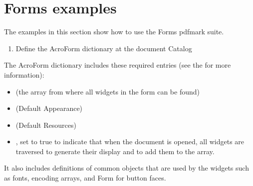 \documentclass[letterpaper,12pt,english,openany,oneside]{sphinxmanual}
\begin{document}
\section{Forms examples}
\label{\detokenize{pdfmark_Examples:forms-examples}}
The examples in this section show how to use the Forms pdfmark suite.
\begin{enumerate}
%
\item {} 
Define the AcroForm dictionary at the document Catalog

\end{enumerate}

The AcroForm dictionary includes these required entries (see the  for more information):
\begin{itemize}
\item {} 
 (the array from where all widgets in the form can be found)

\item {} 
 (Default Appearance)

\item {} 
 (Default Resources)

\item {} 
 , set to true to indicate that when the document is opened, all widgets are traversed to generate their display and to add them to the  array.

\end{itemize}

It also includes definitions of common objects that are used by the widgets such as fonts, encoding arrays, and Form  for button faces.
\end{document}
